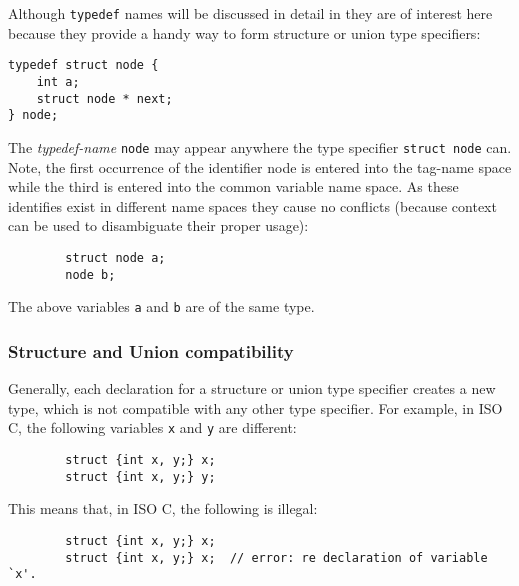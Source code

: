 Although {\tt typedef} names will be discussed in detail in
 they are of interest here because they 
provide a handy way to form structure or union type specifiers:

\begin{production}
\begin{verbatim}
typedef struct node {
    int a;
    struct node * next;
} node;
\end{verbatim}
\end{production}

The {\it typedef-name} {\tt node} may appear anywhere the type specifier
{\tt struct node} can.  Note, the first occurrence of the identifier
node is entered into the tag-name space while the third is entered
into the common variable name space. As these identifies exist in
different name spaces they cause no conflicts (because context can be
used to disambiguate their proper usage):

\begin{production}
\begin{verbatim}
        struct node a;
        node b;
\end{verbatim}
\end{production}
 The above variables {\tt a} and {\tt b} are of the same type.

\subsubsection{Structure and Union compatibility}
\label{sec:StructureCompatability}

Generally, each declaration for a structure or union type specifier
creates a new type, which is not compatible with any other type
specifier. For example, in ISO C, the following variables {\tt x} and
{\tt y} are different:

\begin{production}
\begin{verbatim}
        struct {int x, y;} x;
        struct {int x, y;} y;
\end{verbatim}
\end{production}

This means that, in ISO C, the following is illegal:

\begin{production}
\begin{verbatim}
        struct {int x, y;} x;
        struct {int x, y;} x;  // error: re declaration of variable `x'.
\end{verbatim}
\end{production}

